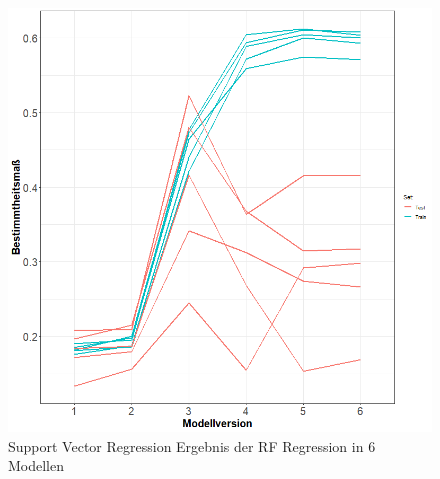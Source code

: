 \documentclass[a4paper,12pt]{thesis}
\begin{document}
\begin{figure}[!ht]
	\centering
	\includegraphics[width=\textwidth]{Plots/plot44.png}
	\caption{Support Vector Regression Ergebnis der RF Regression in 6 Modellen}
	\label{SVR_ModelSelection}
\end{figure}
\end{document}
